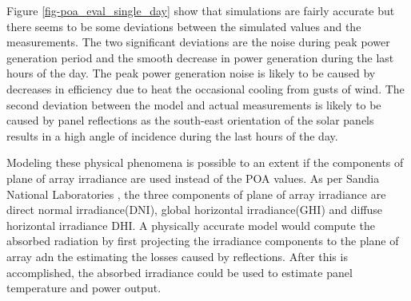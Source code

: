 \noindent Figure \ref{fig-poa_eval_single_day} show that simulations are fairly accurate but there seems to be some deviations between the simulated values and the measurements. The two significant deviations are the noise during peak power generation period and the smooth decrease in power generation during the last hours of the day. The peak power generation noise is likely to be caused by decreases in efficiency due to heat the occasional cooling from gusts of wind. The second deviation between the model and actual measurements is likely to be caused by panel reflections as the south-east orientation of the solar panels results in a high angle of incidence during the last hours of the day.

Modeling these physical phenomena is possible to an extent if the components of plane of array irradiance are used instead of the POA values. As per Sandia National Laboratories \cite{sandia_poa}, the three components of plane of array irradiance are direct normal irradiance(DNI), global horizontal irradiance(GHI) and diffuse horizontal irradiance DHI. A physically accurate model would compute the absorbed radiation by first projecting the irradiance components to the plane of array adn the estimating the losses caused by reflections. After this is accomplished, the absorbed irradiance could be used to estimate panel temperature and power output.








